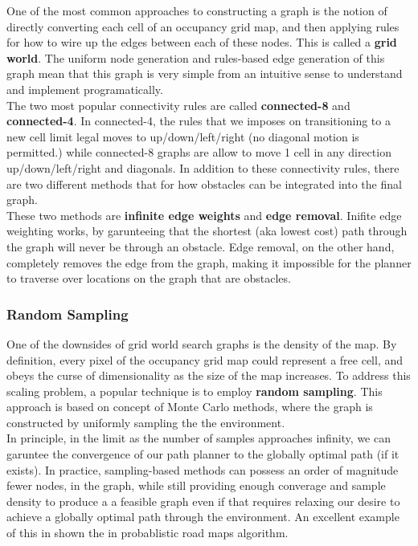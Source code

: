 \documentclass[journal]{IEEEtran}
\begin{document}
One of the most common approaches to constructing a graph is the notion of directly converting each cell of an occupancy grid map, and then applying rules for how to wire up the edges between each of these nodes. This is called a \textbf{grid world}. The uniform node generation and rules-based edge generation of this graph mean that this graph is very simple from an intuitive sense to understand and implement programatically.\\ 

The two most popular connectivity rules are called \textbf{connected-8} and \textbf{connected-4}. In connected-4, the rules that we imposes on transitioning to a new cell limit legal moves to up/down/left/right (no diagonal motion is permitted.) while connected-8 graphs are allow to move 1 cell in any direction up/down/left/right and diagonals. In addition to these connectivity rules, there are two different methods that for how obstacles can be integrated into the final graph. \\

These two methods are \textbf{infinite edge weights} and \textbf{edge removal}. Inifite edge weighting works, by garunteeing that the shortest (aka lowest cost) path through the graph will never be through an obstacle. Edge removal, on the other hand, completely removes the edge from the graph, making it impossible for the planner to traverse over locations on the graph that are obstacles. 

\subsubsection{Random Sampling}

One of the downsides of grid world search graphs is the density of the map. By definition, every pixel of the occupancy grid map could represent a free cell, and obeys the curse of dimensionality as the size of the map increases. To address this scaling problem, a popular technique is to employ \textbf{random sampling}. This approach is based on concept of Monte Carlo methods, where the graph is constructed by uniformly sampling the the environment. \\

In principle, in the limit as the number of samples approaches infinity, we can garuntee the convergence of our path planner to the globally optimal path (if it exists). In practice, sampling-based methods can possess an order of magnitude fewer nodes, in the graph, while still providing enough converage and sample density to produce a a feasible graph even if that requires relaxing our desire to achieve a globally optimal path through the environment. An excellent example of this in shown the in probablistic road maps algorithm. 
\end{document}

